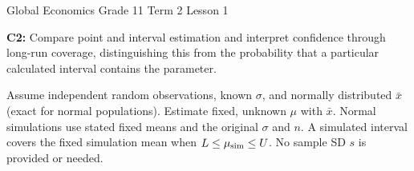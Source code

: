 {
Global Economics \textbar{} Grade 11 \textbar{} Term 2 \textbar{} Lesson 1\par}
\textbf{C2:} Compare point and interval estimation and interpret confidence through long-run coverage, distinguishing this from the probability that a particular calculated interval contains the parameter.

Assume independent random observations, known $\sigma$, and normally distributed $\bar{x}$ (exact for normal populations). Estimate fixed, unknown $\mu$ with $\bar{x}$. Normal simulations use stated fixed means and the original $\sigma$ and $n$. A simulated interval covers the fixed simulation mean when $L\leq\mu_{\rm sim}\leq U$. No sample SD $s$ is provided or needed.

